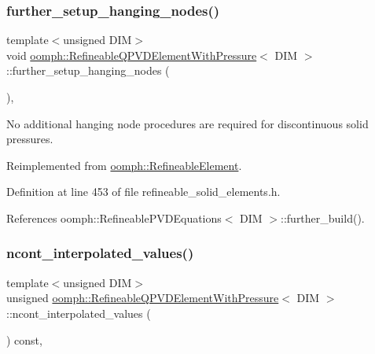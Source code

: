 \subsubsection{\texorpdfstring{further\+\_\+setup\+\_\+hanging\+\_\+nodes()}{further\_setup\_hanging\_nodes()}}
{\footnotesize\ttfamily template$<$unsigned D\+IM$>$ \\
void \hyperlink{classoomph_1_1RefineableQPVDElementWithPressure}{oomph\+::\+Refineable\+Q\+P\+V\+D\+Element\+With\+Pressure}$<$ D\+IM $>$\+::further\+\_\+setup\+\_\+hanging\+\_\+nodes (\begin{DoxyParamCaption}{ }\end{DoxyParamCaption})\hspace{0.3cm}{\ttfamily [inline]}, {\ttfamily [virtual]}}



No additional hanging node procedures are required for discontinuous solid pressures. 



Reimplemented from \hyperlink{classoomph_1_1RefineableElement_a86ea01c485f7ff822dce74b884312ccb}{oomph\+::\+Refineable\+Element}.



Definition at line 453 of file refineable\+\_\+solid\+\_\+elements.\+h.



References oomph\+::\+Refineable\+P\+V\+D\+Equations$<$ D\+I\+M $>$\+::further\+\_\+build().

\mbox{\label{classoomph_1_1RefineableQPVDElementWithPressure_aa73ec04c55ee434543ee171bdd1da914}} 
\subsubsection{\texorpdfstring{ncont\+\_\+interpolated\+\_\+values()}{ncont\_interpolated\_values()}}
{\footnotesize\ttfamily template$<$unsigned D\+IM$>$ \\
unsigned \hyperlink{classoomph_1_1RefineableQPVDElementWithPressure}{oomph\+::\+Refineable\+Q\+P\+V\+D\+Element\+With\+Pressure}$<$ D\+IM $>$\+::ncont\+\_\+interpolated\+\_\+values (\begin{DoxyParamCaption}{ }\end{DoxyParamCaption}) const\hspace{0.3cm}{\ttfamily [inline]}, {\ttfamily [virtual]}}



